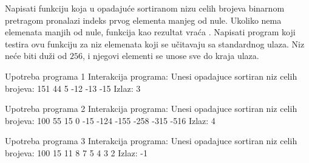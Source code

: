 \begin{Exercise}[label=408]
Napisati funkciju koja u opadajuće sortiranom nizu celih brojeva
binarnom pretragom pronalazi indeks prvog elementa manjeg od nule. Ukoliko nema elemenata
manjih od nule, funkcija kao rezultat vraća . Napisati
program koji testira ovu funkciju za niz elemenata koji se
učitavaju sa standardnog ulaza. Niz neće biti duži od
$256$, i njegovi elementi se unose sve do kraja ulaza.

\begin{minitest}
\begin{test}{Upotreba programa 1}
Interakcija programa:
  Unesi opadajuce
  sortiran niz celih
  brojeva:  
  151 44 5 -12 -13 -15
Izlaz:
  3
\end{test}
\end{minitest}
\begin{minitest}
\begin{test}{Upotreba programa 2}
Interakcija programa:
  Unesi opadajuce
  sortiran niz celih
  brojeva:
  100 55 15 0 -15 -124
  -155 -258 -315 -516
Izlaz:
  4
\end{test}
\end{minitest}
\begin{minitest}
\begin{test}{Upotreba programa 3}
Interakcija programa:
  Unesi opadajuce
  sortiran niz celih
  brojeva:
  100 15 11 8 7 5 4 3 2
Izlaz:
  -1
\end{test}
\end{minitest}


\end{Exercise}


